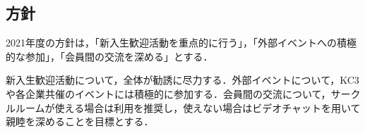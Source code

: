 \subsection*{\newGradeIfKouki{}\secondGrade{}方針}


2021年度の\newGradeIfKouki{}\secondGrade{}方針は，「新入生歓迎活動を重点的に行う」，「外部イベントへの積極的な参加」，「会員間の交流を深める」とする．

新入生歓迎活動について，\secondGrade{}全体が勧誘に尽力する．外部イベントについて，KC3や各企業共催のイベントには積極的に参加する．会員間の交流について，サークルルームが使える場合は利用を推奨し，使えない場合はビデオチャットを用いて親睦を深めることを目標とする．
